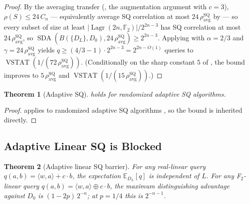 \documentclass[11pt,a4paper]{article}
\theoremstyle{plain}
\newtheorem{theorem}{Theorem}[section]
\theoremstyle{definition}
\newcommand{\F}{\mathbb{F}}
\newcommand{\E}{\mathbb{E}}
\DeclareMathOperator{\Lagr}{Lagr}
\DeclareMathOperator{\SDA}{SDA}
\DeclareMathOperator{\VSTAT}{VSTAT}
\begin{document}
\begin{proof}
By the averaging transfer (, the augmentation argument with $c=3$), $\rho(S)\le 24\,C_n$ --- equivalently average SQ correlation at most $24\,\rho_{\mathrm{avg}}^{\mathrm{SQ}}$ by  --- so every subset of size at least $|\Lagr(2n,\F_2)| / 2^{2n-3}$ has SQ correlation at most $24\,\rho_{\mathrm{avg}}^{\mathrm{SQ}}$, so $\SDA(B(\{D_L\},D_0), 24\,\rho_{\mathrm{avg}}^{\mathrm{SQ}}) \geq 2^{2n-3}$. Applying  with $\alpha = 2/3$ and $\gamma = 24\,\rho_{\mathrm{avg}}^{\mathrm{SQ}}$ yields $q \geq (4/3 - 1) \cdot 2^{2n-3} = 2^{2n - O(1)}$ queries to $\VSTAT(1/(72\,\rho_{\mathrm{avg}}^{\mathrm{SQ}}))$. (Conditionally on the sharp constant $5$ of , the bound improves to $5\,\rho_{\mathrm{avg}}^{\mathrm{SQ}}$ and $\VSTAT(1/(15\,\rho_{\mathrm{avg}}^{\mathrm{SQ}}))$.)
\end{proof}

\begin{theorem}[Adaptive SQ]
 holds for randomized adaptive SQ algorithms.
\end{theorem}

\begin{proof}
 applies to randomized adaptive SQ algorithms \cite[Theorem 3.7]{FGR+17}, so the bound is inherited directly.
\end{proof}

\subsection{Adaptive Linear SQ is Blocked}
\label{subsec:adaptive-linear}

\begin{theorem}[Adaptive linear SQ barrier]
\label{thm:linear-sq}
For any real-linear query $q(a,b) = \langle w, a \rangle + c \cdot b$, the expectation $\E_{D_L}[q]$ is independent of $L$. For any F$_2$-linear query $q(a,b)=\langle w,a\rangle \oplus c\cdot b$, the maximum distinguishing advantage against $D_0$ is $(1-2p)\,2^{-n}$; at $p=1/4$ this is $2^{-n-1}$.
\end{theorem}
\end{document}
